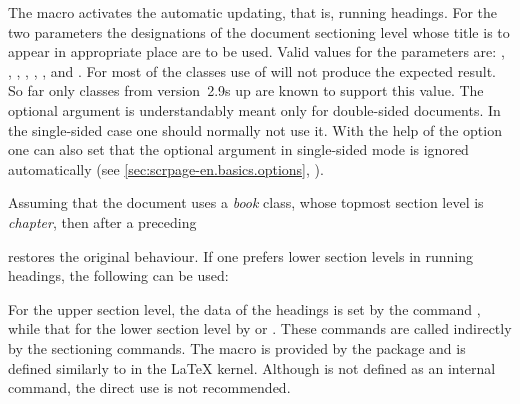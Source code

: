\begin{Declaration}
\end{Declaration}%
The macro  activates the automatic updating, that is, running
headings.  For the two parameters the designations of the document sectioning
level whose title is to appear in appropriate place are to be used.  Valid
values for the parameters are:
, ,
, , ,
, and .  For most of the classes use of
 will not produce the expected result. So far only {\KOMAScript}
classes from version~2.9s up are known to support this value. The optional
argument  is understandably meant only for double-sided
documents. In the single-sided case one should normally not use it.  With the
help of the option
one can also set that the optional argument in single-sided mode is ignored
automatically (see \autoref{sec:scrpage-en.basics.options},
).
%
\begin{Example}
  Assuming that the document uses a \emph{book} class, whose topmost
  section level is \emph{chapter}, then after a preceding
\begin{lstcode}
\end{lstcode}
  restores the original behaviour.  If one prefers lower section levels
  in running headings, the following can be used:
\begin{lstcode}
\end{lstcode}
\end{Example}

\begin{Explain}
  For the upper section level, the data of the headings is set by the command
  , while that for the lower section level
  by  or
  .  These commands are called
  indirectly by the sectioning commands.  The macro  is
  provided by the package  and is defined similarly to
   in the {\LaTeX} kernel.  Although  is not
  defined as an internal command, the direct use is not recommended.
\end{Explain}
\EndIndexGroup
%
\EndIndexGroup


